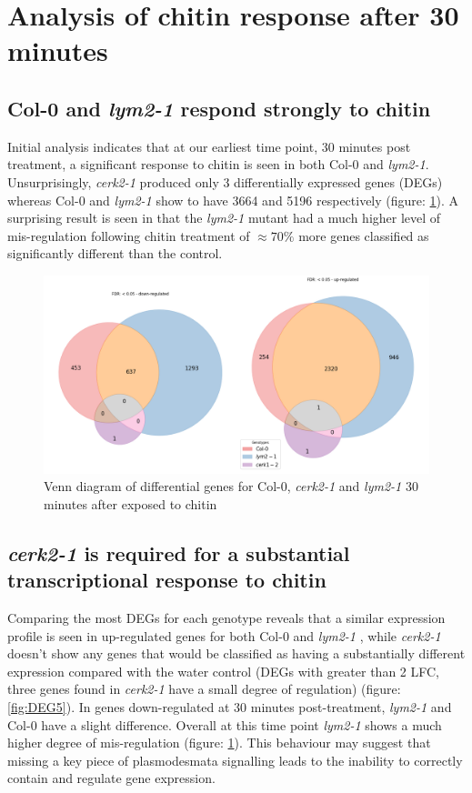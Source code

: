 \documentclass[../main.tex]{subfiles}
\begin{document}
\section{Analysis of chitin response after 30 minutes}
\label{sec:seqresults}

\subsection{Col-0 and \textit{lym2-1} respond strongly to chitin}

Initial analysis indicates that at our earliest time point, 30 minutes post
treatment, a significant response to chitin is seen in both Col-0 and
\textit{lym2-1}. Unsurprisingly, \textit{cerk2-1} produced only 3 differentially
expressed genes (DEGs) whereas Col-0 and \textit{lym2-1} show to have 3664 and
5196 respectively (figure: \ref{fig:05hrDEGs}). A surprising result is seen in that the
\textit{lym2-1} mutant had a much higher level of mis-regulation following
chitin treatment of $\approx70\%$ more genes classified as significantly different
than the control.

\begin{figure}[ht]
  \centering
  \includegraphics[width=0.8\columnwidth]{figures/vennTreatmentschitin.png}
  \caption[Venn diagram of differential genes 30 minutes post-chitin treatment]{\label{fig:05hrDEGs} Venn diagram of differential genes for Col-0,
    \textit{cerk2-1} and \textit{lym2-1} 30 minutes after exposed to chitin}
\end{figure}

\subsection{\textit{cerk2-1} is required for a substantial transcriptional response to chitin}

Comparing the most DEGs for each genotype reveals that a similar expression
profile is seen in up-regulated genes for both Col-0 and \textit{lym2-1} , while
\textit{cerk2-1} doesn't show any genes that would be classified as having a
substantially different expression compared with the water control (DEGs with
greater than 2 LFC, three genes found in \textit{cerk2-1} have a small degree of
regulation) (figure: \ref{fig:DEG5}). In genes down-regulated at 30
minutes post-treatment, \textit{lym2-1} and Col-0 have a slight difference.
Overall at this time point \textit{lym2-1} shows a much higher degree of
mis-regulation (figure: \ref{fig:05hrDEGs}). This behaviour may suggest that
missing a key piece of plasmodesmata signalling leads to the inability to
correctly contain and regulate gene expression.
\end{document}
